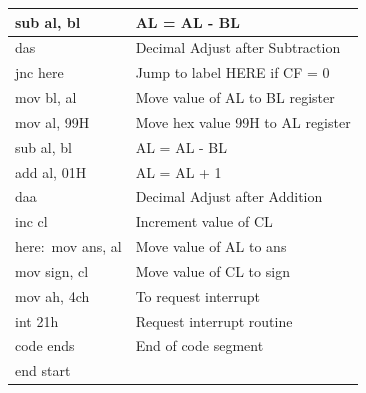 \documentclass[10pt,a4paper]{article}
\begin{document}
\begin{flushleft}
\begin{table}[htb]
{\begin{tabular}{|l|l|}
\hline 
sub al, bl                                                       & AL = AL - BL                                  \\
\hline
das                                                              & Decimal Adjust after Subtraction              \\
\hline                                                           
jnc here                                                         & Jump to label HERE if CF = 0                  \\
\hline
mov bl, al                                                       & Move value of AL to BL register               \\
\hline
mov al, 99H                                                      & Move hex value 99H to AL register             \\
\hline
sub al, bl                                                       & AL = AL - BL                                  \\
\hline
add al, 01H                                                      & AL = AL + 1                                   \\
\hline 
daa                                                              & Decimal Adjust after Addition                 \\
\hline
inc cl                                                           & Increment value of CL                         \\
\hline
here:~mov ans, al                                                & Move value of AL to ans                       \\
\hline
mov sign, cl                                                     & Move value of CL to sign                      \\
\hline
mov ah, 4ch                                                      & To request interrupt                          \\
\hline
int 21h                                                          & Request interrupt routine                     \\ 
\hline
code ends                                                        & End of code segment                           \\
\hline
end start                                                        &                                               \\
\hline
\end{tabular}
}
\end{table}


\end{flushleft}
\end{document}

